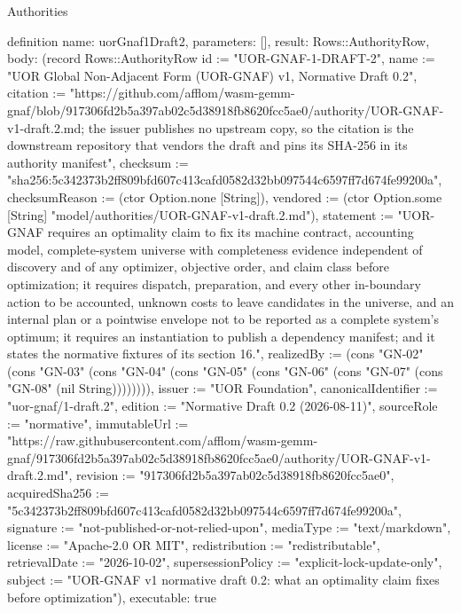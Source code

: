 \begin{lexlean}{Authorities}
\begin{semanticmodule}
definition{
  name: uorGnaf1Draft2,
  parameters: [],
  result: Rows::AuthorityRow,
  body: (record Rows::AuthorityRow {id := "UOR-GNAF-1-DRAFT-2", name := "UOR Global Non-Adjacent Form (UOR-GNAF) v1, Normative Draft 0.2", citation := "https://github.com/afflom/wasm-gemm-gnaf/blob/917306fd2b5a397ab02c5d38918fb8620fcc5ae0/authority/UOR-GNAF-v1-draft.2.md; the issuer publishes no upstream copy, so the citation is the downstream repository that vendors the draft and pins its SHA-256 in its authority manifest", checksum := "sha256:5c342373b2ff809bfd607c413cafd0582d32bb097544c6597ff7d674fe99200a", checksumReason := (ctor Option.none [String]), vendored := (ctor Option.some [String] "model/authorities/UOR-GNAF-v1-draft.2.md"), statement := "UOR-GNAF requires an optimality claim to fix its machine contract, accounting model, complete-system universe with completeness evidence independent of discovery and of any optimizer, objective order, and claim class before optimization; it requires dispatch, preparation, and every other in-boundary action to be accounted, unknown costs to leave candidates in the universe, and an internal plan or a pointwise envelope not to be reported as a complete system's optimum; it requires an instantiation to publish a dependency manifest; and it states the normative fixtures of its section 16.", realizedBy := (cons "GN-02" (cons "GN-03" (cons "GN-04" (cons "GN-05" (cons "GN-06" (cons "GN-07" (cons "GN-08" (nil String)))))))), issuer := "UOR Foundation", canonicalIdentifier := "uor-gnaf/1-draft.2", edition := "Normative Draft 0.2 (2026-08-11)", sourceRole := "normative", immutableUrl := "https://raw.githubusercontent.com/afflom/wasm-gemm-gnaf/917306fd2b5a397ab02c5d38918fb8620fcc5ae0/authority/UOR-GNAF-v1-draft.2.md", revision := "917306fd2b5a397ab02c5d38918fb8620fcc5ae0", acquiredSha256 := "5c342373b2ff809bfd607c413cafd0582d32bb097544c6597ff7d674fe99200a", signature := "not-published-or-not-relied-upon", mediaType := "text/markdown", license := "Apache-2.0 OR MIT", redistribution := "redistributable", retrievalDate := "2026-10-02", supersessionPolicy := "explicit-lock-update-only", subject := "UOR-GNAF v1 normative draft 0.2: what an optimality claim fixes before optimization"}),
  executable: true
}


\end{semanticmodule}
\end{lexlean}

